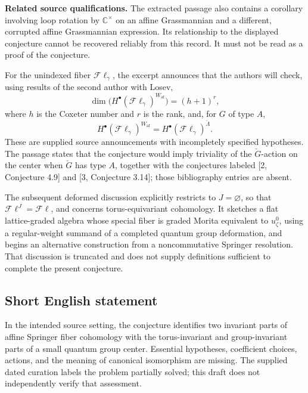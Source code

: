 \documentclass[11pt]{article}
\newcommand{\C}{\mathbb{C}}
\begin{document}
\textbf{Related source qualifications.} The extracted passage also contains a corollary involving loop rotation by \(\C^\times\) on an affine Grassmannian and a different, corrupted affine Grassmannian expression. Its relationship to the displayed conjecture cannot be recovered reliably from this record. It must not be read as a proof of the conjecture.

For the unindexed fiber \(\mathcal F\ell_\gamma\), the excerpt announces that the authors will check, using results of the second author with Losev,
\[
\dim\bigl(H^\bullet(\mathcal F\ell_\gamma)^{W_{\mathrm{af}}}\bigr)=(h+1)^r,
\]
where \(h\) is the Coxeter number and \(r\) is the rank, and, for \(G\) of type \(A\),
\[
H^\bullet(\mathcal F\ell_\gamma)^{W_{\mathrm{af}}}
=H^\bullet(\mathcal F\ell_\gamma)^{\check\Lambda}.
\]
These are supplied source announcements with incompletely specified hypotheses. The passage states that the conjecture would imply triviality of the \(\check G\)-action on the center when \(\check G\) has type \(A\), together with the conjectures labeled [2, Conjecture 4.9] and [3, Conjecture 3.14]; those bibliography entries are absent.

The subsequent deformed discussion explicitly restricts to \(J=\varnothing\), so that \(\mathcal F\ell^J=\mathcal F\ell\), and concerns torus-equivariant cohomology. It sketches a flat lattice-graded algebra whose special fiber is graded Morita equivalent to \(u^0_\zeta\), using a regular-weight summand of a completed quantum group deformation, and begins an alternative construction from a noncommutative Springer resolution. That discussion is truncated and does not supply definitions sufficient to complete the present conjecture.
\subsection{Short English statement}
In the intended source setting, the conjecture identifies two invariant parts of affine Springer fiber cohomology with the torus-invariant and group-invariant parts of a small quantum group center. Essential hypotheses, coefficient choices, actions, and the meaning of canonical isomorphism are missing. The supplied dated curation labels the problem partially solved; this draft does not independently verify that assessment.
\end{document}
